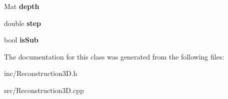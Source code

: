 \begin{DoxyCompactItemize}
\item 
Mat {\bfseries depth}\hypertarget{class_reconstruction3_d_a00af4dca9c1d488144ce23329ce66e99}{}\label{class_reconstruction3_d_a00af4dca9c1d488144ce23329ce66e99}

\item 
double {\bfseries step}\hypertarget{class_reconstruction3_d_a41852efe3e2a50a2e80c4d8dd4f77773}{}\label{class_reconstruction3_d_a41852efe3e2a50a2e80c4d8dd4f77773}

\item 
bool {\bfseries is\+Sub}\hypertarget{class_reconstruction3_d_a67df1a6fff82ecbd603eea2dc8bc6235}{}\label{class_reconstruction3_d_a67df1a6fff82ecbd603eea2dc8bc6235}

\end{DoxyCompactItemize}


The documentation for this class was generated from the following files\+:\begin{DoxyCompactItemize}
\item 
inc/Reconstruction3\+D.\+h\item 
src/Reconstruction3\+D.\+cpp\end{DoxyCompactItemize}
